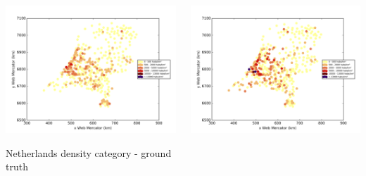 \documentclass[c]{beamer}
\begin{document}
\begin{frame}
\begin{columns}
 \begin{column}{0.5\textwidth}
  \begin{overlayarea}{\linewidth}{4cm}
    \centering\vfill
    \includegraphics[scale=0.50]{images/Netherlands/density_ground_truth.png}
  \end{overlayarea}
  \begin{overlayarea}{\linewidth}{0.5cm}
    \centering
    \tiny Netherlands density category - ground truth\par
  \end{overlayarea}
 \end{column}
 \begin{column}{0.5\textwidth}
  \begin{overlayarea}{\linewidth}{4cm}
    \centering\vfill
    \includegraphics[scale=0.50]{images/Netherlands/knn/density_classification.png}

\end{overlayarea}
\end{column}
\end{columns}
\end{frame}
\end{document}
